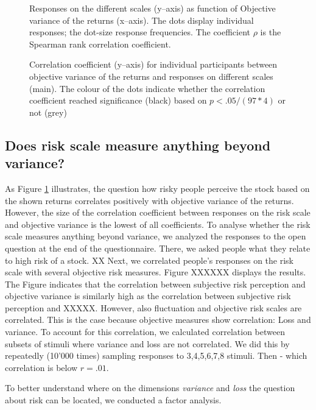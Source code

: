\documentclass[a4paper,man, natbib,floatsintext]{apa6} %
\begin{document}
\begin{figure}[!htbp] 
  \centering
  \caption{Responses on the different scales (y--axis) as function of Objective variance of the returns (x--axis). The dots display individual responses; the dot-size response frequencies. The coefficient $\rho$ is the Spearman rank correlation coefficient. }
  \label{fig:rsvo}
\end{figure}


\begin{figure}[!htbp] 
  \centering
  \caption{Correlation coefficient (y--axis) for individual participants between objective variance of the returns and responses on different scales (main). The colour of the dots indicate whether the correlation coefficient reached significance (black) based on $p < .05 / (97 * 4)$ or not (grey)}
  \label{fig:rsvoind}
\end{figure}


\subsection{Does risk scale measure anything beyond variance?}
As Figure \ref{fig:rsvo} illustrates, the question how risky people perceive the stock based on the shown returns correlates positively with objective variance of the returns. However, the size of the correlation coefficient between responses on the risk scale and objective variance is the lowest of all coefficients. To analyse whether the risk scale measures anything beyond variance, we analyzed the responses to the open question at the end of the questionnaire. There, we asked people what they relate to high risk of a stock. XX
Next, we correlated people's responses on the risk scale with several objective risk measures. Figure XXXXXX displays the results. The Figure indicates that the correlation between subjective risk perception and objective variance is similarly high as the correlation between subjective risk perception and XXXXX. However, also fluctuation and objective risk scales are correlated. This is the case because objective measures show correlation: Loss and variance. To account for this correlation, we calculated correlation between subsets of stimuli where variance and loss are not correlated. We did this by repeatedly (10'000 times) sampling responses to 3,4,5,6,7,8 stimuli. Then - which correlation is below $r = .01$. 



To better understand where on the dimensions \textit{variance} and \textit{loss} the question about risk can be located, we conducted a factor analysis. 
\end{document}
